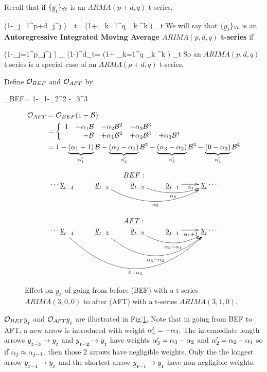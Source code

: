 Recall 
that if 
${\{{\underline{y}}_t\}_{\forall t}}$ is an $ARMA(p+d,q)$
t-series,

\beq
\left(1-\sum_{j=1}^{p+d}\alp_j\calb^j
\right)
\rvy_t=
\left(1+
\sum_{k=1}^q \nu_k \calb^k
\right)
\rvn_t
\eeq
We will
say that
${\{{\underline{y}}_t\}_{\forall t}}$
is an {\bf Autoregressive Integrated
 Moving Average 
$ARIMA(p,d,q)$ t-series} if



\beq
\left(1-\sum_{j=1}^{p}\alp_j\calb^j
\right)
_
{(1-\calb)^d\rvy_t}=
\left(1+
\sum_{k=1}^q \nu_k \calb^k
\right)
\rvn_t
\eeq
So an $ARIMA(p,d,q)$ t-series
is a special
case of an $ARMA(p+d, q)$ t-series.

Define ${\cal O}_{BEF}$ and ${\cal O}_{AFT}$ by

\beq
\calo_{BEF}=
1-\alp_1\calb-\alp_2\calb^2
-\alp_3\calb^3
\eeq

\begin{align}
{\cal O}_{AFT}
&={\cal O}_{BEF}(1-{\cal B})
\\
&=
\left\{
\begin{array}{rrrrr}
1
&-\alpha_1{\cal B}
&-\alpha_2{\cal B}^2
&-\alpha_3{\cal B}^3
\\
&
-{\cal B}
&+\alpha_1{\cal B}^2
&+\alpha_2{\cal B}^3
&+\alpha_3{\cal B}^4
\end{array}
\right.
\\
&=
1  -\underbrace{(\alpha_1+1)}_{\alpha_1'}{\cal B}
-\underbrace{(\alpha_2-\alpha_1)}_{\alpha_2'}{\cal B}^2
-\underbrace{(\alpha_3-\alpha_2)}_{\alpha_3'}{\cal B}^3
-\underbrace{(0-\alpha_3)}_{\alpha_4'}{\cal B}^4
\end{align}

\begin{figure}[h!]
$$
\begin{array}{c}
BEF:
\\
\xymatrix{
\cdots
\rvy_{t-4}
&\rvy_{t-3}\ar@/_2pc/[rrr]_{\alp_3}
&\rvy_{t-2}\ar@/_1pc/[rr]_{\alp_2}
&\rvy_{t-1}\ar[r]_{\alp_1}
&\rvy_t
\cdots
}
\\
\\
AFT:
\\
\xymatrix{
\cdots
\rvy_{t-4}\ar@/_4.5pc/[rrrr]_{0-\alp_3}
&\rvy_{t-3}\ar@/_3pc/[rrr]_{\alp_3-\alp_2}
&\rvy_{t-2}\ar@/_1.5pc/[rr]_{\alp_2-\alp_1}
&\rvy_{t-1}\ar[r]_{\alp_1+1}
&\rvy_t
\cdots
}
\end{array}
$$
\caption{
Effect on ${\underline{y}}_t$ 
of going from
before (BEF)
with a t-series $ARIMA(3,0,0)$
to after (AFT)
with a t-series $ARIMA(3, 1, 0)$.
}
\label{fig-bef-aft-diff}
\end{figure}

${\cal O}_{BEF}{\underline{y}}_t$
and ${\cal O}_{AFT}{\underline{y}}_t$
are illustrated in 
Fig.\ref{fig-bef-aft-diff}.
Note that
in going from BEF to AFT,
a new arrow is 
introduced
with weight $\alpha_4'
=-\alpha_3$.
The intermediate length 
arrows ${\underline{y}}_{t-3}\rightarrow {\underline{y}}_t$
and ${\underline{y}}_{t-2}\rightarrow {\underline{y}}_t$
have weights $\alpha_3'=\alpha_3-\alpha_2$
and $\alpha_2'=\alpha_2-\alpha_1$
so if $\alpha_j\approx \alpha_{j-1}$,
then those 2
arrows have negligible weights.
Only the
the longest arrow
${\underline{y}}_{t-4}\rightarrow{\underline{y}}_t$
and the shortest arrow ${\underline{y}}_{t-1}\rightarrow {\underline{y}}_t$
have non-negligible weights. 

